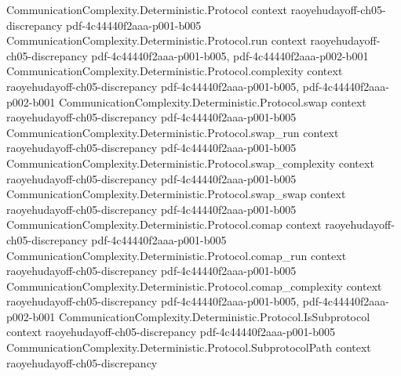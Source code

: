 \begin{lemma}
\label{CommunicationComplexity.Functions.InnerProduct.sq_discrepancy_prod_le}
\leanok
{}
\proofstep
  {CommunicationComplexity.Deterministic.Protocol}
  {context}
  {raoyehudayoff-ch05-discrepancy}
  {pdf-4c44440f2aaa-p001-b005}
\proofstep
  {CommunicationComplexity.Deterministic.Protocol.run}
  {context}
  {raoyehudayoff-ch05-discrepancy}
  {pdf-4c44440f2aaa-p001-b005,
    pdf-4c44440f2aaa-p002-b001}
\proofstep
  {CommunicationComplexity.Deterministic.Protocol.complexity}
  {context}
  {raoyehudayoff-ch05-discrepancy}
  {pdf-4c44440f2aaa-p001-b005,
    pdf-4c44440f2aaa-p002-b001}
\proofstep
  {CommunicationComplexity.Deterministic.Protocol.swap}
  {context}
  {raoyehudayoff-ch05-discrepancy}
  {pdf-4c44440f2aaa-p001-b005}
\proofstep
  {CommunicationComplexity.Deterministic.Protocol.swap_run}
  {context}
  {raoyehudayoff-ch05-discrepancy}
  {pdf-4c44440f2aaa-p001-b005}
\proofstep
  {CommunicationComplexity.Deterministic.Protocol.swap_complexity}
  {context}
  {raoyehudayoff-ch05-discrepancy}
  {pdf-4c44440f2aaa-p001-b005}
\proofstep
  {CommunicationComplexity.Deterministic.Protocol.swap_swap}
  {context}
  {raoyehudayoff-ch05-discrepancy}
  {pdf-4c44440f2aaa-p001-b005}
\proofstep
  {CommunicationComplexity.Deterministic.Protocol.comap}
  {context}
  {raoyehudayoff-ch05-discrepancy}
  {pdf-4c44440f2aaa-p001-b005}
\proofstep
  {CommunicationComplexity.Deterministic.Protocol.comap_run}
  {context}
  {raoyehudayoff-ch05-discrepancy}
  {pdf-4c44440f2aaa-p001-b005}
\proofstep
  {CommunicationComplexity.Deterministic.Protocol.comap_complexity}
  {context}
  {raoyehudayoff-ch05-discrepancy}
  {pdf-4c44440f2aaa-p001-b005,
    pdf-4c44440f2aaa-p002-b001}
\proofstep
  {CommunicationComplexity.Deterministic.Protocol.IsSubprotocol}
  {context}
  {raoyehudayoff-ch05-discrepancy}
  {pdf-4c44440f2aaa-p001-b005}
\proofstep
  {CommunicationComplexity.Deterministic.Protocol.SubprotocolPath}
  {context}
  {raoyehudayoff-ch05-discrepancy}

\end{lemma}
